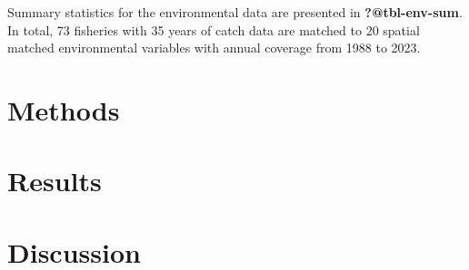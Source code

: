 \documentclass[
  letterpaper,
  DIV=11,
  numbers=noendperiod]{scrartcl}
\begin{document}
Summary statistics for the environmental data are presented in
\textbf{?@tbl-env-sum}. In total, 73 fisheries with 35 years of catch
data are matched to 20 spatial matched environmental variables with
annual coverage from 1988 to 2023.

\hypertarget{sec-methods}{%
\section{Methods}\label{sec-methods}}

\hypertarget{sec-results}{%
\section{Results}\label{sec-results}}

\hypertarget{sec-discussion}{%
\section*{Discussion}\label{sec-discussion}}
\end{document}
